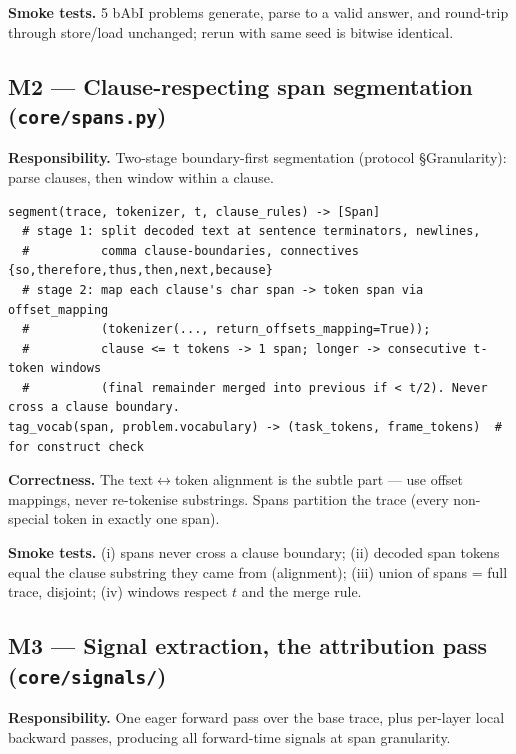 \documentclass[11pt]{article}
\begin{document}
\textbf{Smoke tests.} 5 bAbI problems generate, parse to a valid answer, and round-trip through
store/load unchanged; rerun with same seed is bitwise identical.

\subsection{M2 --- Clause-respecting span segmentation (\texttt{core/spans.py})}
\textbf{Responsibility.} Two-stage boundary-first segmentation (protocol \S Granularity): parse clauses,
then window within a clause.
\begin{lstlisting}
segment(trace, tokenizer, t, clause_rules) -> [Span]
  # stage 1: split decoded text at sentence terminators, newlines,
  #          comma clause-boundaries, connectives {so,therefore,thus,then,next,because}
  # stage 2: map each clause's char span -> token span via offset_mapping
  #          (tokenizer(..., return_offsets_mapping=True));
  #          clause <= t tokens -> 1 span; longer -> consecutive t-token windows
  #          (final remainder merged into previous if < t/2). Never cross a clause boundary.
tag_vocab(span, problem.vocabulary) -> (task_tokens, frame_tokens)  # for construct check
\end{lstlisting}
\textbf{Correctness.} The text$\leftrightarrow$token alignment is the subtle part --- use offset mappings,
never re-tokenise substrings. Spans partition the trace (every non-special token in exactly one span).

\textbf{Smoke tests.} (i) spans never cross a clause boundary; (ii) decoded span tokens equal the clause
substring they came from (alignment); (iii) union of spans = full trace, disjoint; (iv) windows respect
$t$ and the merge rule.

\subsection{M3 --- Signal extraction, the attribution pass (\texttt{core/signals/})}
\textbf{Responsibility.} One eager forward pass over the base trace, plus per-layer local backward passes,
producing all forward-time signals at span granularity.
\end{document}
